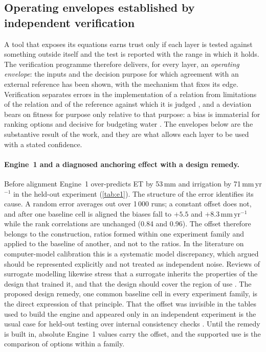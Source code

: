 \documentclass[preprint,12pt]{elsarticle}
\begin{document}
\subsection{Operating envelopes established by independent verification}
\label{sec:discrep}
A tool that exposes its equations earns trust only if each layer is tested against something outside itself and the test is reported with the range in which it holds. The verification programme therefore delivers, for every layer, an \emph{operating envelope}: the inputs and the decision purpose for which agreement with an external reference has been shown, with the mechanism that fixes its edge. Verification separates errors in the implementation of a relation from limitations of the relation and of the reference against which it is judged \cite{Oreskes1994,Refsgaard2004}, and a deviation bears on fitness for purpose only relative to that purpose: a bias is immaterial for ranking options and decisive for budgeting water \cite{Bennett2013,Moriasi2007}. The envelopes below are the substantive result of the work, and they are what allows each layer to be used with a stated confidence.

\paragraph{Engine~1 and a diagnosed anchoring effect with a design remedy.} Before alignment Engine~1 over-predicts ET by 53\,mm and irrigation by 71\,mm\,yr$^{-1}$ in the held-out experiment (\cref{tab:e1}). The structure of the error identifies its cause. A random error averages out over 1\,000 runs; a constant offset does not, and after one baseline cell is aligned the biases fall to $+5.5$ and $+8.3$\,mm\,yr$^{-1}$ while the rank correlations are unchanged (0.84 and 0.96). The offset therefore belongs to the construction, ratios formed within one experiment family and applied to the baseline of another, and not to the ratios. In the literature on computer-model calibration this is a systematic model discrepancy, which \cite{Kennedy2001} argued should be represented explicitly and not treated as independent noise. Reviews of surrogate modelling likewise stress that a surrogate inherits the properties of the design that trained it, and that the design should cover the region of use \cite{Sacks1989,Razavi2012,Asher2015}. The proposed design remedy, one common baseline cell in every experiment family, is the direct expression of that principle. That the offset was invisible in the tables used to build the engine and appeared only in an independent experiment is the usual case for held-out testing over internal consistency checks \cite{Oreskes1994,Bennett2013}. Until the remedy is built in, absolute Engine~1 values carry the offset, and the supported use is the comparison of options within a family.
\end{document}
